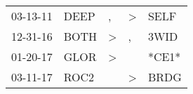 \begin{supertabular}{p{0.07\textwidth}p{0.06\textwidth}p{0.02\textwidth}p{0.02\textwidth}p{0.06\textwidth}}
 03-13-11\textsuperscript{} &  DEEP\textsuperscript{} &             , &  \textgreater &  SELF\textsuperscript{} \\
 12-31-16\textsuperscript{} &  BOTH\textsuperscript{} &  \textgreater &             , &  3WID\textsuperscript{} \\
 01-20-17\textsuperscript{} &  GLOR\textsuperscript{} &  \textgreater &               &                   *CE1* \\
 03-11-17\textsuperscript{} &  ROC2\textsuperscript{} &               &  \textgreater &  BRDG\textsuperscript{} \\
\end{supertabular}

